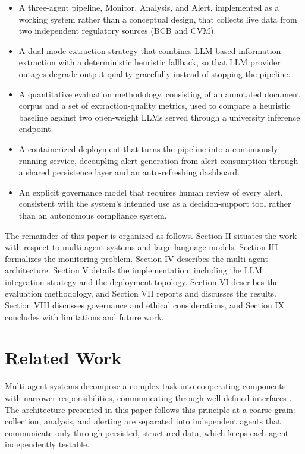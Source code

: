 \documentclass[conference]{IEEEtran}
\begin{document}
\begin{itemize}
\item A three-agent pipeline, Monitor, Analysis, and Alert, implemented as a working system rather than a conceptual design, that collects live data from two independent regulatory sources (BCB and CVM).
\item A dual-mode extraction strategy that combines LLM-based information extraction with a deterministic heuristic fallback, so that LLM provider outages degrade output quality gracefully instead of stopping the pipeline.
\item A quantitative evaluation methodology, consisting of an annotated document corpus and a set of extraction-quality metrics, used to compare a heuristic baseline against two open-weight LLMs served through a university inference endpoint.
\item A containerized deployment that turns the pipeline into a continuously running service, decoupling alert generation from alert consumption through a shared persistence layer and an auto-refreshing dashboard.
\item An explicit governance model that requires human review of every alert, consistent with the system's intended use as a decision-support tool rather than an autonomous compliance system.
\end{itemize}

The remainder of this paper is organized as follows. Section II situates the work with respect to multi-agent systems and large language models. Section III formalizes the monitoring problem. Section IV describes the multi-agent architecture. Section V details the implementation, including the LLM integration strategy and the deployment topology. Section VI describes the evaluation methodology, and Section VII reports and discusses the results. Section VIII discusses governance and ethical considerations, and Section IX concludes with limitations and future work.

\section{Related Work}

Multi-agent systems decompose a complex task into cooperating components with narrower responsibilities, communicating through well-defined interfaces \cite{b1}. The architecture presented in this paper follows this principle at a coarse grain: collection, analysis, and alerting are separated into independent agents that communicate only through persisted, structured data, which keeps each agent independently testable.
\end{document}
